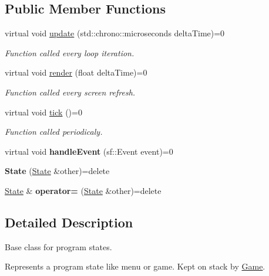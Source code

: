 \subsection*{Public Member Functions}
\begin{DoxyCompactItemize}
\item 
virtual void \hyperlink{classState_af2121f8eb52144b7a789214f15e3601a}{update} (std\-::chrono\-::microseconds delta\-Time)=0
\begin{DoxyCompactList}\small\item\em Function called every loop iteration. \end{DoxyCompactList}\item 
virtual void \hyperlink{classState_af989800e12898aea96188086e9fd649d}{render} (float delta\-Time)=0
\begin{DoxyCompactList}\small\item\em Function called every screen refresh. \end{DoxyCompactList}\item 
virtual void \hyperlink{classState_a1cdec36e9ffad91ba7af560770601017}{tick} ()=0
\begin{DoxyCompactList}\small\item\em Function called periodicaly. \end{DoxyCompactList}\item 
\hypertarget{classState_a30fe6af348c81a2be151e0046d18da6d}{virtual void {\bfseries handle\-Event} (sf\-::\-Event event)=0}\label{classState_a30fe6af348c81a2be151e0046d18da6d}

\item 
\hypertarget{classState_a8fba10b9995ce898339f3b0d39234788}{{\bfseries State} (\hyperlink{classState}{State} \&other)=delete}\label{classState_a8fba10b9995ce898339f3b0d39234788}

\item 
\hypertarget{classState_a7ac6cc4de6723746df3dfb183b8eb84f}{\hyperlink{classState}{State} \& {\bfseries operator=} (\hyperlink{classState}{State} \&other)=delete}\label{classState_a7ac6cc4de6723746df3dfb183b8eb84f}

\end{DoxyCompactItemize}


\subsection{Detailed Description}
Base class for program states. 

Represents a program state like menu or game. Kept on stack by \hyperlink{classGame}{Game}. 

